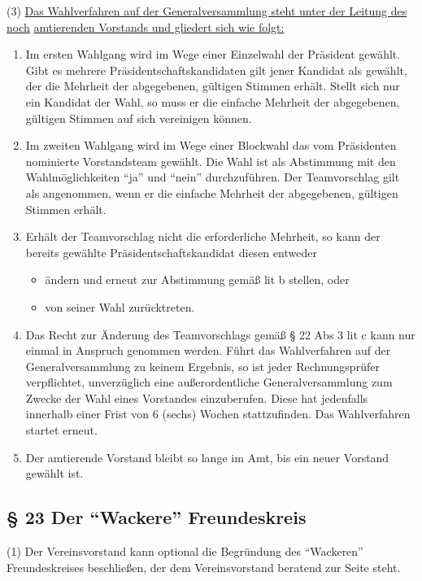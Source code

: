 \documentclass[11pt,a4paper]{article}
\begin{document}
(3)
\underline{Das Wahlverfahren auf der Generalversammlung steht unter der Leitung des noch}
\underline{amtierenden Vorstands und gliedert sich wie folgt:}

\begin{enumerate}[label=\alph*)]
\item
Im ersten Wahlgang wird im Wege einer Einzelwahl der Präsident gewählt.
Gibt es mehrere Präsidentschaftskandidaten gilt jener Kandidat als gewählt, der die Mehrheit der abgegebenen, gültigen Stimmen erhält.
Stellt sich nur ein Kandidat der Wahl, so muss er die einfache Mehrheit der abgegebenen, gültigen Stimmen auf sich vereinigen können.
\item
Im zweiten Wahlgang wird im Wege einer Blockwahl das vom Präsidenten nominierte Vorstandsteam gewählt.
Die Wahl ist als Abstimmung mit den Wahlmöglichkeiten "`ja"' und "`nein"' durchzuführen.
Der Teamvorschlag gilt als angenommen, wenn er die einfache Mehrheit der abgegebenen, gültigen Stimmen erhält.
\item
Erhält der Teamvorschlag nicht die erforderliche Mehrheit, so kann der bereits gewählte Präsidentschaftskandidat diesen entweder
	\begin{itemize}
	\renewcommand\labelitemi{-}
	\item
	ändern und erneut zur Abstimmung gemäß lit b stellen, oder
	\item
	von seiner Wahl zurücktreten.
	\end{itemize}
\item
Das Recht zur Änderung des Teamvorschlags gemäß § 22 Abs 3 lit c kann nur einmal in Anspruch genommen werden.
Führt das Wahlverfahren auf der Generalversammlung zu keinem Ergebnis, so ist jeder Rechnungsprüfer verpflichtet, unverzüglich eine außerordentliche Generalversammlung zum Zwecke der Wahl eines Vorstandes einzuberufen.
Diese hat jedenfalls innerhalb einer Frist von 6 (sechs) Wochen stattzufinden.
Das Wahlverfahren startet erneut.
\item
Der amtierende Vorstand bleibt so lange im Amt, bis ein neuer Vorstand gewählt ist.
\end{enumerate}

\subsection{§ 23
Der "`Wackere"' Freundeskreis}

(1)
Der Vereinsvorstand kann optional die Begründung des "`Wackeren"' Freundeskreises beschließen, der dem Vereinsvorstand beratend zur Seite steht.
\end{document}
